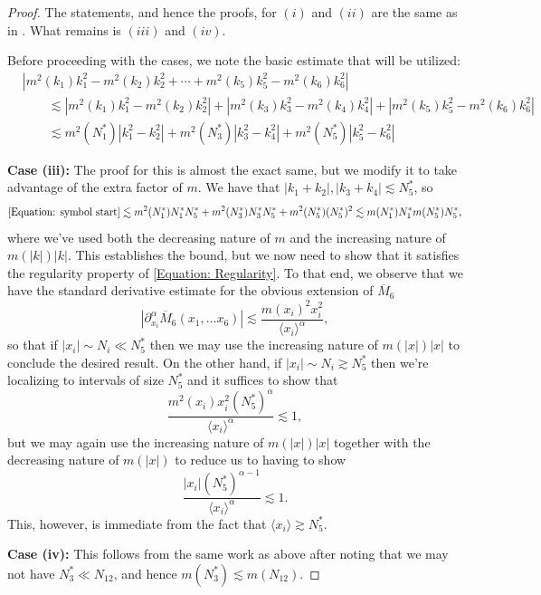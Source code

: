 \documentclass[12pt, letterpaper]{amsart}
\begin{document}
\begin{proof}
    The statements, and hence the proofs, for $(i)$ and $(ii)$ are the same as in \cite{schippa2024improved}. What remains is $(iii)$ and $(iv)$.

    Before proceeding with the cases, we note the basic estimate that will be utilized:
    \begin{align}
        &|m^2(k_1)k_1^2-m^2(k_2)k_2^2 + \cdots + m^2(k_5)k_5^2-m^2(k_6)k_6^2|\nonumber\\
        &\qquad\lesssim |m^2(k_1)k_1^2 - m^2(k_2)k_2^2| + |m^2(k_3)k_3^2 - m^2(k_4)k_4^2| + |m^2(k_5)k_5^2-m^2(k_6)k_6^2|\nonumber\\
        &\qquad\lesssim m^2(N_1^*)|k_1^2-k_2^2| + m^2(N_3^*)|k_3^2-k_4^2| + m^2(N_5^*)|k_5^2-k_6^2|\label{Equation: symbol start}
    \end{align}

    \textbf{Case (iii):} The proof for this is almost the exact same, but we modify it to take advantage of the extra factor of $m$. We have that $|k_1+k_2|,|k_3+k_4|\lesssim N_5^*$, so
    \[
        \eqref{Equation: symbol start}\lesssim m^2(N_1^*)N_1^*N_5^* + m^2(N_3^*)N_3^*N_5^* + m^2(N_5^*)(N_5^*)^2\\
        \lesssim m(N_1^*)N_1^*m(N_5^*)N_5^*,
    \]
    where we've used both the decreasing nature of $m$ and the increasing nature of $m(|k|)|k|$. This establishes the bound, but we now need to show that it satisfies the regularity property of \eqref{Equation: Regularity}. To that end, we observe that we have the standard derivative estimate for the obvious extension of $\overline{M}_6$
    \[
    |\partial^\alpha_{x_i} \overline{M}_6(x_1, \dots x_6)|\lesssim \frac{m(x_i)^2x_i^2}{\langle x_i\rangle^\alpha},
    \]
    so that if $|x_i|\sim N_i\ll N_5^*$ then we may use the increasing nature of $m(|x|)|x|$ to conclude the desired result. On the other hand, if $|x_i|\sim N_i \gtrsim N_5^*$ then we're localizing to intervals of size $N_5^*$ and it suffices to show that
    \[
    \frac{m^2(x_i)x_i^2(N_5^*)^\alpha}{\langle x_i\rangle^{\alpha}}\lesssim 1,
    \]
    but we may again use the increasing nature of $m(|x|)|x|$ together with the decreasing nature of $m(|x|)$ to reduce us to having to show
    \[
    \frac{|x_i|(N_5^*)^{\alpha-1}}{\langle x_i\rangle^{\alpha}}\lesssim 1.
    \]
    This, however, is immediate from the fact that $\langle x_i\rangle \gtrsim N_5^*$.

    \textbf{Case (iv):} This follows from the same work as above after noting that we may not have $N_3^*\ll N_{12}$, and hence $m(N_3^*)\lesssim m(N_{12})$.
\end{proof}
\end{document}

